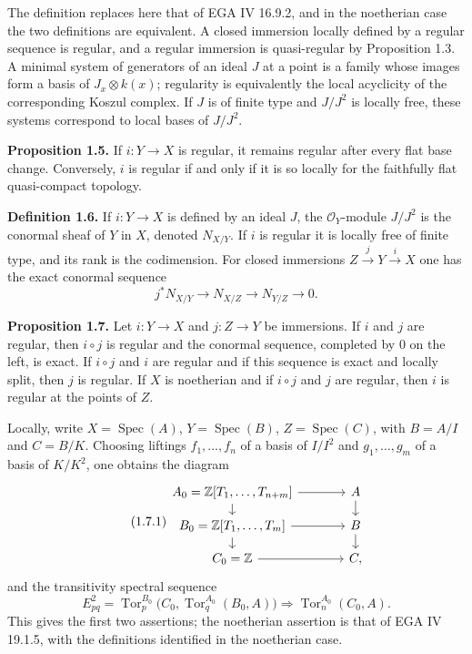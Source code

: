 \documentclass[11pt]{article}
\newcommand{\Tor}{\operatorname{Tor}}
\newcommand{\Spec}{\operatorname{Spec}}
\providecommand{\Tor}{\operatorname{Tor}}
\providecommand{\cO}{\mathcal O}
\begin{document}
The definition replaces here that of EGA IV 16.9.2, and in the noetherian case the two definitions are equivalent. A closed immersion locally defined by a regular sequence is regular, and a regular immersion is quasi-regular by Proposition 1.3. A minimal system of generators of an ideal \(J\) at a point is a family whose images form a basis of \(J_x\otimes k(x)\); regularity is equivalently the local acyclicity of the corresponding Koszul complex. If \(J\) is of finite type and \(J/J^2\) is locally free, these systems correspond to local bases of \(J/J^2\).

\textbf{Proposition 1.5.} If \(i:Y\to X\) is regular, it remains regular after every flat base change. Conversely, \(i\) is regular if and only if it is so locally for the faithfully flat quasi-compact topology.

\textbf{Definition 1.6.} If \(i:Y\to X\) is defined by an ideal \(J\), the \(\cO_Y\)-module \(J/J^2\) is the conormal sheaf of \(Y\) in \(X\), denoted \(N_{X/Y}\). If \(i\) is regular it is locally free of finite type, and its rank is the codimension. For closed immersions \(Z\xrightarrow{j}Y\xrightarrow{i}X\) one has the exact conormal sequence
\begin{equation}\tag{1.6.1}
 j^*N_{X/Y}\longrightarrow N_{X/Z}\longrightarrow N_{Y/Z}\longrightarrow0.
\end{equation}

\textbf{Proposition 1.7.} Let \(i:Y\to X\) and \(j:Z\to Y\) be immersions. If \(i\) and \(j\) are regular, then \(i\circ j\) is regular and the conormal sequence, completed by \(0\) on the left, is exact. If \(i\circ j\) and \(i\) are regular and if this sequence is exact and locally split, then \(j\) is regular. If \(X\) is noetherian and if \(i\circ j\) and \(j\) are regular, then \(i\) is regular at the points of \(Z\).

Locally, write \(X=\Spec(A)\), \(Y=\Spec(B)\), \(Z=\Spec(C)\), with \(B=A/I\) and \(C=B/K\). Choosing liftings \(f_1,\ldots,f_n\) of a basis of \(I/I^2\) and \(g_1,\ldots,g_m\) of a basis of \(K/K^2\), one obtains the diagram
\begin{equation}\tag{1.7.1}
\begin{tikzcd}[column sep=large,row sep=small]
A_0=\mathbb Z[T_1,\ldots,T_{n+m}] \arrow[r] \arrow[d] & A \arrow[d]\\
B_0=\mathbb Z[T_1,\ldots,T_m] \arrow[r] \arrow[d] & B \arrow[d]\\
C_0=\mathbb Z \arrow[r] & C,
\end{tikzcd}
\end{equation}
and the transitivity spectral sequence
\begin{equation}\tag{1.7.3}
E^2_{pq}=\Tor_p^{B_0}\bigl(C_0,\Tor_q^{A_0}(B_0,A)\bigr)\Rightarrow\Tor_n^{A_0}(C_0,A).
\end{equation}
This gives the first two assertions; the noetherian assertion is that of EGA IV 19.1.5, with the definitions identified in the noetherian case.
\end{document}
